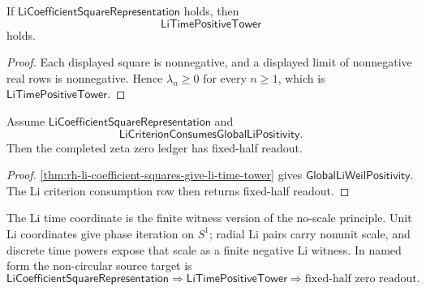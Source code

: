 \begin{theorem}
\label{thm:rh-li-coefficient-squares-give-li-time-tower}
If $\mathsf{LiCoefficientSquareRepresentation}$ holds, then
$$
\mathsf{LiTimePositiveTower}
$$
holds.
\end{theorem}

\begin{proof}
Each displayed square is nonnegative, and a displayed limit of
nonnegative real rows is nonnegative.  Hence $\lambda_n\ge0$ for every
$n\ge1$, which is $\mathsf{LiTimePositiveTower}$.
\end{proof}

\begin{corollary}
\label{cor:rh-li-coefficient-squares-fixed-half-readout}
Assume $\mathsf{LiCoefficientSquareRepresentation}$ and
$$
\mathsf{LiCriterionConsumesGlobalLiPositivity}.
$$
Then the completed zeta zero ledger has fixed-half readout.
\end{corollary}

\begin{proof}
\autoref{thm:rh-li-coefficient-squares-give-li-time-tower} gives
$\mathsf{GlobalLiWeilPositivity}$.  The Li criterion consumption row
then returns fixed-half readout.
\end{proof}

\begin{principle}
\label{prin:rh-li-time-no-scale-target}
The Li time coordinate is the finite witness version of the no-scale
principle.  Unit Li coordinates give phase iteration on $S^1$; radial Li
pairs carry nonunit scale, and discrete time powers expose that scale as
a finite negative Li witness.  In named form the non-circular source
target is
$$
\mathsf{LiCoefficientSquareRepresentation}
\Longrightarrow
\mathsf{LiTimePositiveTower}
\Longrightarrow
\text{fixed-half zero readout}.
$$
\end{principle}
